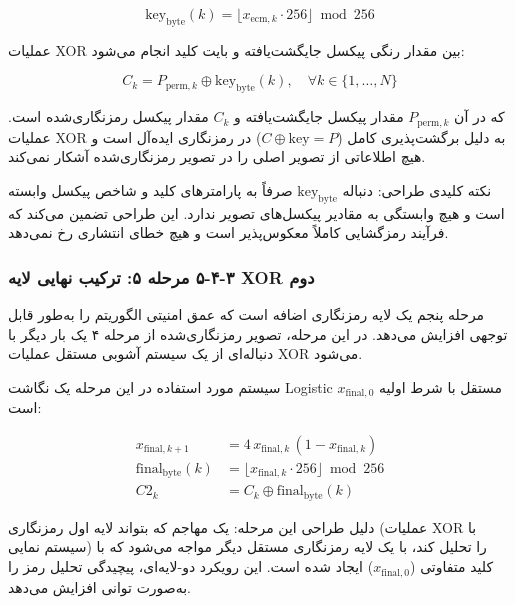 \begin{equation}
\mathrm{key}_{\mathrm{byte}}(k) = \lfloor x_{\mathrm{ecm},k} \cdot 256 \rfloor \bmod 256

\end{equation}

عملیات XOR بین مقدار رنگی پیکسل جایگشت‌یافته و بایت کلید انجام می‌شود:

\begin{equation}
C_k = P_{\mathrm{perm},k} \oplus \mathrm{key}_{\mathrm{byte}}(k), \quad \forall k \in \{1,\ldots,N\}

\end{equation}

که در آن $P_{\mathrm{perm},k}$ مقدار پیکسل جایگشت‌یافته و $C_k$ مقدار پیکسل رمزنگاری‌شده است. عملیات XOR به دلیل برگشت‌پذیری کامل ($C \oplus \mathrm{key} = P$) در رمزنگاری ایده‌آل است و هیچ اطلاعاتی از تصویر اصلی را در تصویر رمزنگاری‌شده آشکار نمی‌کند.

نکته کلیدی طراحی: دنباله $\mathrm{key}_{\mathrm{byte}}$ صرفاً به پارامترهای کلید و شاخص پیکسل وابسته است و هیچ وابستگی به مقادیر پیکسل‌های تصویر ندارد. این طراحی تضمین می‌کند که فرآیند رمزگشایی کاملاً معکوس‌پذیر است و هیچ خطای انتشاری رخ نمی‌دهد\cite{ref6}.

\subsubsection{‏۳‏-‏۴‏-‏۵‏ مرحله ۵: ترکیب نهایی لایه XOR دوم}

مرحله پنجم یک لایه رمزنگاری اضافه است که عمق امنیتی الگوریتم را به‌طور قابل توجهی افزایش می‌دهد. در این مرحله، تصویر رمزنگاری‌شده از مرحله ۴ یک بار دیگر با دنباله‌ای از یک سیستم آشوبی مستقل عملیات XOR می‌شود.

سیستم مورد استفاده در این مرحله یک نگاشت Logistic مستقل با شرط اولیه $x_{\mathrm{final},0}$ است:

\begin{align}
x_{\mathrm{final},k+1} &= 4\,x_{\mathrm{final},k}\,(1-x_{\mathrm{final},k}) \\
\mathrm{final}_{\mathrm{byte}}(k) &= \lfloor x_{\mathrm{final},k} \cdot 256 \rfloor \bmod 256 \\
C2_k &= C_k \oplus \mathrm{final}_{\mathrm{byte}}(k)

\end{align}

دلیل طراحی این مرحله: یک مهاجم که بتواند لایه اول رمزنگاری (عملیات XOR با سیستم نمایی) را تحلیل کند، با یک لایه رمزنگاری مستقل دیگر مواجه می‌شود که با کلید متفاوتی ($x_{\mathrm{final},0}$) ایجاد شده است. این رویکرد دو-لایه‌ای، پیچیدگی تحلیل رمز را به‌صورت توانی افزایش می‌دهد.

